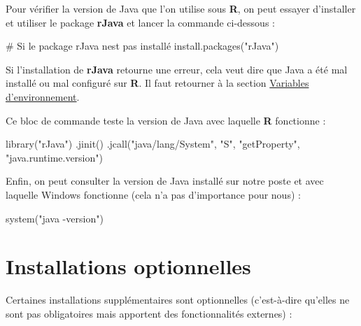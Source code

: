 \documentclass[
]{article}
\newenvironment{Shaded}{\begin{snugshade}}{\end{snugshade}}
\newcommand{\CommentTok}[1]{\textcolor[rgb]{0.37,0.37,0.37}{#1}}
\newcommand{\FunctionTok}[1]{\textcolor[rgb]{0.28,0.35,0.67}{#1}}
\newcommand{\NormalTok}[1]{\textcolor[rgb]{0.00,0.46,0.62}{#1}}
\newcommand{\StringTok}[1]{\textcolor[rgb]{0.13,0.47,0.30}{#1}}
\begin{document}
Pour vérifier la version de Java que l'on utilise sous \textbf{R}, on
peut essayer d'installer et utiliser le package \textbf{rJava} et lancer
la commande ci-dessous :

\begin{Shaded}
\begin{Highlighting}[]
\CommentTok{\# Si le package rJava n\textquotesingle{}est pas installé}
\FunctionTok{install.packages}\NormalTok{(}\StringTok{"rJava"}\NormalTok{)}
\end{Highlighting}
\end{Shaded}

Si l'installation de \textbf{rJava} retourne une erreur, cela veut dire
que Java a été mal installé ou mal configuré sur \textbf{R}. Il faut
retourner à la section \protect\hyperlink{var_env}{Variables
d'environnement}.

Ce bloc de commande teste la version de Java avec laquelle \textbf{R}
fonctionne :

\begin{Shaded}
\begin{Highlighting}[]
\FunctionTok{library}\NormalTok{(}\StringTok{"rJava"}\NormalTok{)}
\FunctionTok{.jinit}\NormalTok{()}
\FunctionTok{.jcall}\NormalTok{(}\StringTok{"java/lang/System"}\NormalTok{, }\StringTok{"S"}\NormalTok{, }\StringTok{"getProperty"}\NormalTok{, }\StringTok{"java.runtime.version"}\NormalTok{)}
\end{Highlighting}
\end{Shaded}

Enfin, on peut consulter la version de Java installé sur notre poste et
avec laquelle Windows fonctionne (cela n'a pas d'importance pour nous) :

\begin{Shaded}
\begin{Highlighting}[]
\FunctionTok{system}\NormalTok{(}\StringTok{"java {-}version"}\NormalTok{)}
\end{Highlighting}
\end{Shaded}

\hypertarget{installations-optionnelles}{%
\section{Installations optionnelles}\label{installations-optionnelles}}

Certaines installations supplémentaires sont optionnelles (c'est-à-dire
qu'elles ne sont pas obligatoires mais apportent des fonctionnalités
externes) :
\end{document}
